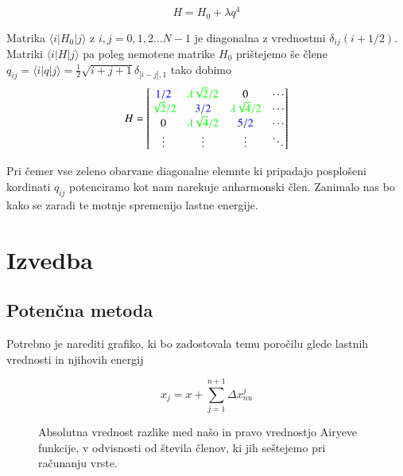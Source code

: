 \documentclass[11pt]{article}
\begin{document}
\begin{equation}
H = H_0 + \lambda q^4
\end{equation}

Matrika $\langle i|H_0| j\rangle $ z $i,j = 0,1,2...N-1$ je diagonalna z vrednostmi $\delta_{ij}(i +1/2)$. Matriki $\langle i|H|j \rangle$ pa poleg nemotene matrike $H_0$ prištejemo še člene $q_{ij} = \langle i|q|j \rangle = \frac{1}{2} \sqrt{i + j + 1} \delta_{|i-j|,1} $ tako dobimo
$$
H =
 \begin{bmatrix}
 {\color{blue}1/2}		 & {\color{green}\lambda \sqrt{2}/2} & 0								& \cdots \\
 {\color{green} \sqrt{2}/2}& {\color{blue}3/2} 				    & {\color{green}\lambda \sqrt{4}/2} & \cdots \\
 0 		   				 &{\color{green}\lambda \sqrt{4}/2}  & {\color{blue}5/2} 				& \cdots  \\
  \vdots			   		& \vdots	 						    & \vdots 							& \ddots
 \end{bmatrix}
$$

Pri čemer vse zeleno obarvane diagonalne elemnte ki pripadajo posplošeni kordinati $ q_{ij}$ potenciramo kot nam narekuje anharmonski člen.
Zanimalo nas bo kako se zaradi te motnje spremenijo lastne energije.





\section{Izvedba}
\subsection{Potenčna metoda}


Potrebno je narediti grafiko, ki bo zadostovala temu poročilu glede lastnih vrednosti in njihovih energij 

$$ x_j = x + \sum_{j = 1}^{n+1} \Delta x_{nu}^j$$




\begin{figure}[h!]	 %
\begin{center}


\end{center}
\caption{Absolutna vrednost razlike med našo in pravo vrednostjo Airyeve funkcije, v odvisnosti od števila členov, ki jih seštejemo pri računanju vrste.}
\end{figure}
\end{document}
